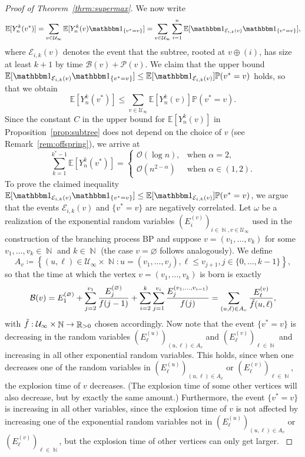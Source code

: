 \documentclass[11pt]{article}
\numberwithin{equation}{section}
\DeclareMathOperator{\R}{\mathbb{R}} %
\DeclareMathOperator{\N}{\mathbb{N}} %
\renewcommand{\P}{\mathbb{P}} %
\newcommand{\E}{\mathbb{E}} %
\newcommand{\be}{\begin{equation}}
\newcommand{\ee}{\end{equation}}
\newcommand{\bp}{\mathrm{BP}}
\def\cB{{\mathcal B}}
\def\cE{{\mathcal E}}
\def\cO{{\mathcal O}}
\def\cP{{\mathcal P}}
\def\cU{{\mathcal U}}
\theoremstyle{definition}
\begin{document}
\begin{proof}[Proof of Theorem~\ref{thrm:supermax}]
    We now write 
    \be 
    \E[Y^k_n(v^*)]=\sum_{v\in \cU_\infty}\E[Y^k_n(v)\mathbbm 1_{\{v^*=v\}}]=\sum_{v\in \cU_\infty}\sum_{i=1}^n \E[\mathbbm 1_{\cE_{i,k}(v)}\mathbbm 1_{\{v^*=v\}}], 
    \ee 
    where $\cE_{i,k}(v)$ denotes the event that the subtree, rooted at $v\oplus (i)$, has size at least $k+1$ by time $\cB(v)+\cP(v)$. We claim that the upper  bound $\E[\mathbbm 1_{\cE_{i,k}(v)}\mathbbm 1_{\{v^*=v\}}]\leq \E[\mathbbm 1_{\cE_{i,k}(v)}]\P(v^*=v)$ holds, so that we obtain 
    \be 
    \E[Y^k_n(v^*)]\leq \sum_{v\in \cU_\infty}\E[Y^k_n(v)]\P(v^*=v). 
    \ee
    Since the constant $C$ in the upper bound for $\E[Y^k_n(v)]$ in Proposition~\ref{prop:subtree} does not depend on the choice of $v$ (see Remark~\ref{rem:offspring}), we arrive at \be\label{eq:expsubtreebound} \sum_{k=1}^{k^*-1}\E[Y_n^k(v^*)]=\begin{cases} \cO(\log n), &\mbox{when }\alpha=2, \\
    \cO(n^{2-\alpha}) &\mbox{when }\alpha\in(1,2).
    \end{cases}
    \ee
    To prove the claimed inequality $\E[\mathbbm 1_{\cE_{i,k}(v)}\mathbbm 1_{\{v^*=v\}}]\leq \E[\mathbbm 1_{\cE_{i,k}(v)}]\P(v^*=v)$, we argue that the events $\cE_{i,k}(v)$ and $\{v^*=v\}$ are negatively correlated. Let $\omega$ be a realization of the exponential random variables $(E_i^{(v)})_{i\in\N,v\in\cU_\infty}$ used in the construction of the branching process $\bp$ and suppose $v=(v_1,\ldots , v_k)$ for some $v_1,\ldots , v_k\in\N$ and $k\in\N$ (the case $v=\varnothing$ follows 
    analogously). { We define 
    \be 
    A_v \coloneqq \left\{ (u,\ell) \in \cU_\infty \times \N : u=(v_1,\ldots,v_j), \ell \leq v_{j+1} , j \in \{0,\ldots,k-1\}\right\} , 
    \ee 
    so that the time at which the vertex $v=(v_1,\ldots,v_k)$ is born is exactly
    \begin{equation*}
\cB(v)=E^{(\varnothing)}_1+\sum_{j=2}^{v_1}\frac{E^{(\varnothing)}_j}{f(j-1)}+\sum_{i=2}^k \sum_{j=1}^{v_i}\frac{E^{\scriptsize (v_1, \ldots, v_{i-1})}_j}{f(j)}
=
\sum_{(u,\ell) \in A_v} \frac{E^{(v)}_\ell}{\Tilde{f}(u,\ell)},
    \end{equation*}
    with $\Tilde{f}: \cU_\infty \times \N \to \R_{>0}$ chosen accordingly.
    Now note that the event $\{v^* = v\}$ is decreasing in the random variables $( E_{\ell}^{(u)} )_{(u,\ell) \in A_v}$ and $( E_{\ell}^{(v)} )_{\ell \in \N}$ and increasing in all other exponential random variables. This holds, since when one decreases one of the random variables in $( E_{\ell}^{(u)})_{(u,\ell)\in A_v}$ or $( E_{\ell}^{(v)})_{\ell \in \N}$, the explosion time of $v$ decreases. (The explosion time of some other vertices will also decrease, but by exactly the same amount.) Furthermore, the event $\{v^*=v\}$ is increasing in all other variables, since the explosion time of $v$ is not affected by increasing one of the exponential random variables not in $( E_{\ell}^{(u)} )_{(u,\ell)\in A_v}$ or $( E_{\ell}^{(v)} )_{\ell \in \N}$, but the explosion time of other vertices can only get larger. 
}
\end{proof}
\end{document}
